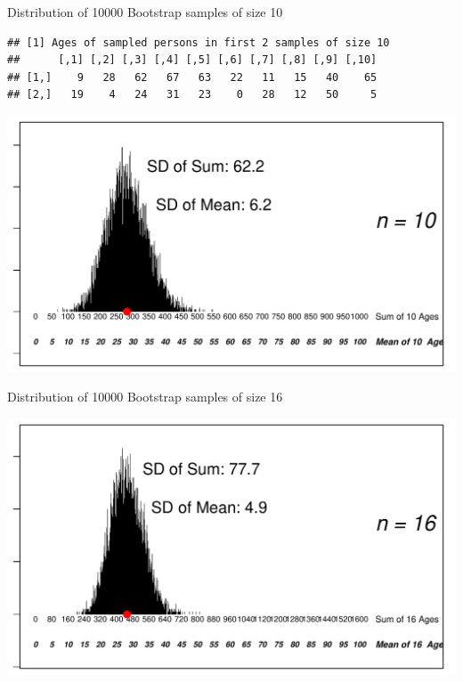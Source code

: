 \documentclass[10pt]{beamer}\usepackage[]{graphicx}\usepackage[]{color}
\makeatletter
\def\maxwidth{ %
  \ifdim\Gin@nat@width>\linewidth
    \linewidth
  \else
    \Gin@nat@width
  \fi
}
\newenvironment{kframe}{%
 \def\at@end@of@kframe{}%
 \ifinner\ifhmode%
  \def\at@end@of@kframe{\end{minipage}}%
  \begin{minipage}{\columnwidth}%
 \fi\fi%
 \def\FrameCommand##1{\hskip\@totalleftmargin \hskip-\fboxsep
 \colorbox{shadecolor}{##1}\hskip-\fboxsep
     \hskip-\linewidth \hskip-\@totalleftmargin \hskip\columnwidth}%
 \MakeFramed {\advance\hsize-\width
   \@totalleftmargin\z@ \linewidth\hsize
   \@setminipage}}%
 {\par\unskip\endMakeFramed%
 \at@end@of@kframe}
\newenvironment{knitrout}{}{} %
\makeatother
\begin{document}
\begin{frame}[fragile]{Distribution of 10000 Bootstrap samples of size 10}
\begin{knitrout}\tiny
{}\color{fgcolor}\begin{kframe}
\begin{verbatim}
## [1] Ages of sampled persons in first 2 samples of size 10
##      [,1] [,2] [,3] [,4] [,5] [,6] [,7] [,8] [,9] [,10]
## [1,]    9   28   62   67   63   22   11   15   40    65
## [2,]   19    4   24   31   23    0   28   12   50     5
\end{verbatim}
\end{kframe}

{\centering \includegraphics[width=\maxwidth]{figure/unnamed-chunk-4-1} 

}



\end{knitrout}
	
\end{frame}




\begin{frame}[fragile]{Distribution of 10000 Bootstrap samples of size 16}
\begin{knitrout}\tiny
{}\color{fgcolor}

{\centering \includegraphics[width=\maxwidth]{figure/unnamed-chunk-5-1} 

}



\end{knitrout}
	
\end{frame}
\end{document}
